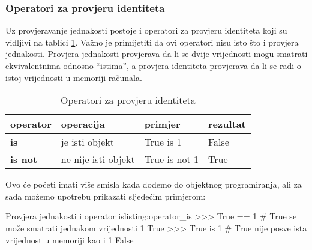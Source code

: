 \subsubsection{Operatori za provjeru identiteta}

Uz provjeravanje jednakosti postoje i operatori za provjeru identiteta koji su vidljivi na tablici \ref{tab:operatori-identitet}. Važno je primijetiti da ovi operatori nisu isto što i provjera jednakosti. Provjera jednakosti provjerava da li se dvije vrijednosti mogu smatrati ekvivalentnima odnosno \textquotedblleft istima\textquotedblright{}, a provjera identiteta provjerava da li se radi o istoj vrijednosti u memoriji računala.


\begin{table}[h!]
    \begin{center}
        \caption{Operatori za provjeru identiteta}
        \label{tab:operatori-identitet}
        \begin{tabular}{llll}
        	\textbf{operator} & \textbf{operacija}  & \textbf{primjer} & \textbf{rezultat} \\ \hline
        	\textbf{is}       & je isti objekt      & True is 1        & False             \\
        	\textbf{is not}   & ne nije isti objekt & True is not 1    & True
        \end{tabular}
    \end{center}
\end{table}

Ovo će početi imati više smisla kada dođemo do objektnog programiranja, ali za sada možemo upotrebu prikazati sljedećim primjerom:

\begin{python}{Provjera jednakosti i operator is}{listing:operator_is}
>>> True == 1  # True se može smatrati jednakom vrijednosti 1
True
>>> True is 1  # True nije posve ista vrijednost u memoriji kao i 1
False
\end{python}



\begin{comment}
Python Bitwise Operators
Bitwise operators are used to compare (binary) numbers:

Operator	Name	Description
\end{comment}

